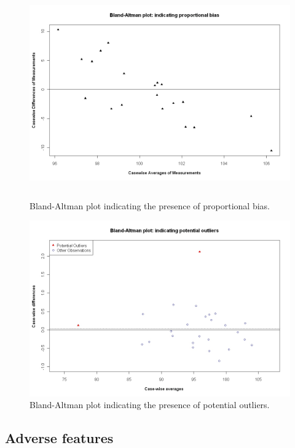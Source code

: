 \documentclass[Main.tex]{subfiles}
\begin{document}
	\begin{figure}[h!]
		\begin{center}
			\includegraphics[height=90mm]{images/PropBias.jpeg}
			\caption{Bland-Altman plot indicating the presence of proportional bias.}\label{PropBias}
		\end{center}
	\end{figure}
	
	\begin{figure}[h!]
		\begin{center}
			\includegraphics[width=125mm]{images/BAOutliers.jpeg}
			\caption{Bland-Altman plot indicating the presence of potential outliers.}\label{Outliers}
		\end{center}
	\end{figure}


	\subsection{Adverse features}
	
\end{document}
